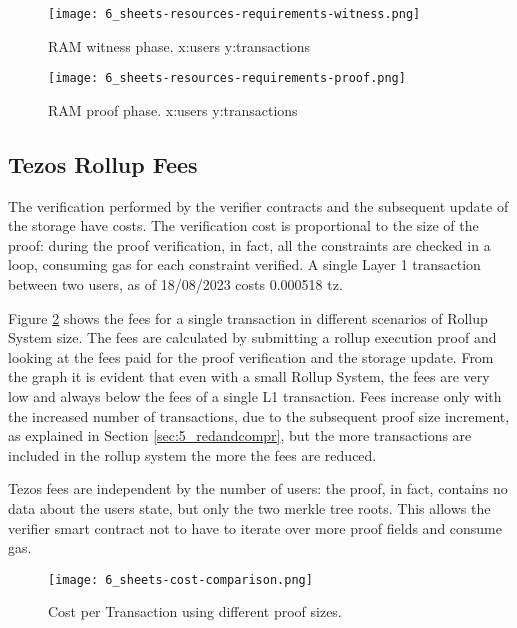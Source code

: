 \begin{figure}
	\centering
	\begin{minipage}{.5\textwidth}
		\centering
		\texttt{[image: 6\_sheets-resources-requirements-witness.png]}
		\caption[RAM Compile]{RAM witness phase. \newline x:users y:transactions}
		\label{fig:7_sheets-resources-requirements-witness.png}
	\end{minipage}%
	\begin{minipage}{.5\textwidth}
		\centering
		\texttt{[image: 6\_sheets-resources-requirements-proof.png]}
		\caption[RAM Proof]{RAM proof phase. \newline x:users y:transactions}
		\label{fig:7_sheets-resources-requirements-proof.png}
	\end{minipage}
\end{figure}

\subsection{Tezos Rollup Fees}

The verification performed by the verifier contracts and the subsequent update of the storage have costs. The verification cost is proportional to the size of the proof: during the proof verification, in fact, all the constraints are checked in a loop, consuming gas for each constraint verified. A single Layer 1 transaction between two users, as of 18/08/2023 costs 0.000518 tz.

Figure \ref{fig:7_sheets-cost-comparison.png} shows the fees for a single transaction in different scenarios of Rollup System size. The fees are calculated by submitting a rollup execution proof and looking at the fees paid for the proof verification and the storage update. From the graph it is evident that even with a small Rollup System, the fees are very low and always below the fees of a single L1 transaction. Fees increase only with the increased number of transactions, due to the subsequent proof size increment, as explained in Section \ref{sec:5_redandcompr}, but the more transactions are included in the rollup system the more the fees are reduced.

Tezos fees are independent by the number of users: the proof, in fact, contains no data about the users state, but only the two merkle tree roots. This allows the verifier smart contract not to have to iterate over more proof fields and consume gas.

\begin{figure}[ht]
	\centering
	\texttt{[image: 6\_sheets-cost-comparison.png]}
	\caption[Cost Comparison]{Cost per Transaction using different proof sizes.}
	\label{fig:7_sheets-cost-comparison.png}
\end{figure}


